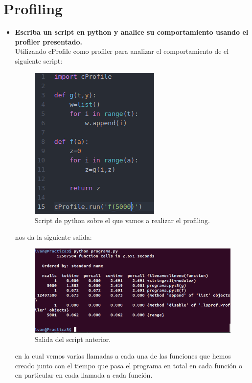 \section{Profiling}
	\begin{itemize}
		\item \textbf{Escriba un script en python y analice su comportamiento usando el profiler presentado.}\\
		Utilizando cProfile\cite{python} como profiler para analizar el comportamiento de el siguiente script:\\
		\begin{figure}[H]
		\centering
		\includegraphics[width=0.4\linewidth]{pythonProgram}
		\caption[Script en python]{Script de python sobre el que vamos a realizar el profiling.}
		\label{fig:pythonProgram}
		\end{figure}
		
		nos da la siguiente salida:\\
		
		\begin{figure}[H]
		\centering
		\includegraphics[width=0.8\linewidth]{python_profiling}
		\caption[profiling python]{Salida del script anterior.}
		\label{fig:python_profiling}
		\end{figure}
		
		en la cual vemos varias llamadas a cada una de las funciones que hemos creado junto con el tiempo que pasa el programa en total en cada función o en particular en cada llamada a cada función.


	\end{itemize}

